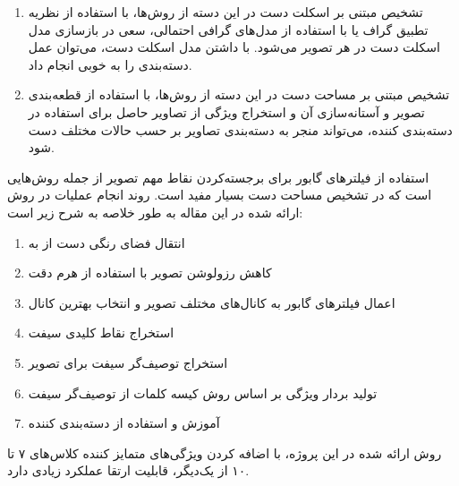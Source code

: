 \documentclass[11.5pt,a4paper]{article}
\begin{document}
\begin{enumerate}
\item تشخیص مبتنی بر اسکلت دست
در این دسته از روش‌ها، با استفاده از نظریه تطبیق گراف یا با استفاده از مدل‌های گرافی احتمالی، سعی در بازسازی مدل اسکلت دست در هر تصویر می‌شود. با داشتن مدل اسکلت دست، می‌توان عمل دسته‌بندی را به خوبی انجام داد.
\item تشخیص مبتنی بر مساحت دست
در این دسته از روش‌ها، با استفاده از قطعه‌بندی تصویر و آستانه‌سازی آن و استخراج ویژگی از تصاویر حاصل برای استفاده در دسته‌بندی کننده، می‌تواند منجر به دسته‌بندی تصاویر بر حسب حالات مختلف دست شود.
\end{enumerate}

استفاده از فیلترهای گابور برای برجسته‌کردن نقاط مهم تصویر از جمله روش‌هایی است که در تشخیص مساحت دست بسیار مفید است. روند انجام عملیات در روش ارائه شده در این مقاله به طور خلاصه به شرح زیر است:

\begin{enumerate}
\item انتقال فضای رنگی دست از  به 
\item کاهش رزولوشن تصویر با استفاده از هرم دقت
\item اعمال فیلترهای گابور به کانال‌های مختلف تصویر و انتخاب بهترین کانال
\item استخراج نقاط کلیدی سیفت
\item استخراج توصیف‌گر سیفت برای تصویر
\item تولید بردار ویژگی بر اساس روش کیسه کلمات از توصیف‌گر سیفت
\item آموزش و استفاده از دسته‌بندی کننده 
\end{enumerate}

روش ارائه شده در این پروژه، با اضافه کردن ویژگی‌های متمایز کننده کلاس‌های ۷ تا ۱۰ از یک‌دیگر، قابلیت ارتقا عملکرد زیادی دارد.

\newpage


\end{document}
